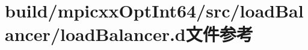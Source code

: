 \hypertarget{build_2mpicxxOptInt64_2src_2loadBalancer_2loadBalancer_8d}{
\section{build/mpicxxOptInt64/src/loadBalancer/loadBalancer.d文件参考}
\label{build_2mpicxxOptInt64_2src_2loadBalancer_2loadBalancer_8d}
}
